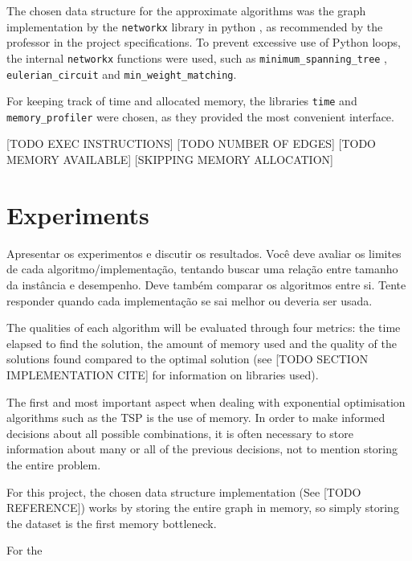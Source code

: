 \documentclass[12pt]{article}
\begin{document}
The chosen data structure for the approximate algorithms was the graph implementation 
by the \texttt{networkx} library in python \cite{networkx_docs}, as recommended by 
the professor in the project specifications. To prevent excessive use of Python loops, 
the internal \texttt{networkx} functions were used, such as \texttt{minimum\_spanning\_tree} , 
\texttt{eulerian\_circuit} and \texttt{min\_weight\_matching}.

For keeping track of time and allocated memory, the libraries \texttt{time} and 
\texttt{memory\_profiler} were chosen, as they provided the most convenient interface.

[TODO EXEC INSTRUCTIONS]
[TODO NUMBER OF EDGES]
[TODO MEMORY AVAILABLE]
[SKIPPING MEMORY ALLOCATION]

\section{Experiments} \label{sec:firstpage}
    Apresentar os experimentos e discutir os resultados. Você deve avaliar os
    limites de cada algoritmo/implementação, tentando buscar uma relação entre
    tamanho da instância e desempenho. Deve também comparar os algoritmos
    entre si. Tente responder quando cada implementação se sai melhor ou
    deveria ser usada.

The qualities of each algorithm will be evaluated through four metrics: the time elapsed 
to find the solution, the amount of memory used and the quality of the solutions found 
compared to the optimal solution (see [TODO SECTION IMPLEMENTATION CITE] for information 
on libraries used).


The first and most important aspect when dealing with exponential optimisation algorithms such as 
the TSP is the use of memory. In order to make informed decisions about all possible combinations, 
it is often necessary to store information about many or all of the previous decisions, not to 
mention storing the entire problem.

For this project, the chosen data structure implementation (See [TODO REFERENCE]) works by storing 
the entire graph in memory, so simply storing the dataset is the first memory bottleneck.

For the 
\end{document}
